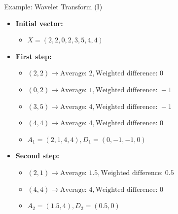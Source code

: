 \begin{frame}{Example: Wavelet Transform (I)}
	\begin{itemize}
		\item \textbf{Initial vector:}
		\begin{itemize}
			\item $X = (2,2,0,2,3,5,4,4)$                
		\end{itemize}
		\item \textbf{First step:}
		\begin{itemize}
			\item $(2,2) \rightarrow \text{Average: } 2, \text{Weighted 
			difference: } 0$
			\item $(0,2) \rightarrow \text{Average: } 1, \text{Weighted 
			difference: } -1$ 
			\item $(3,5) \rightarrow \text{Average: } 4, \text{Weighted 
			difference: } -1$ 
			\item $(4,4) \rightarrow \text{Average: } 4, \text{Weighted 
			difference: } 0$ 
			\item $A_1=(2,1,4,4), D_1=(0,-1,-1,0)$	            
		\end{itemize}
		\item \textbf{Second step:}
		\begin{itemize}
			\item $(2,1) \rightarrow \text{Average: } 1.5, \text{Weighted 
				difference: } 0.5$
			\item $(4,4) \rightarrow \text{Average: } 4, \text{Weighted 
				difference: } 0$ 
			\item $A_2=(1.5,4), D_2=(0.5,0)$	            
		\end{itemize}
	\end{itemize}
\end{frame}

